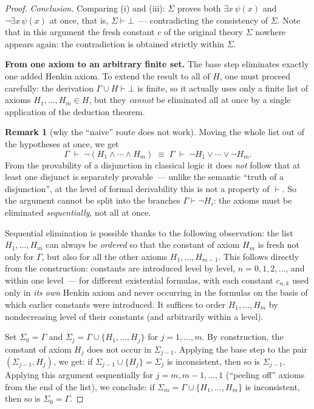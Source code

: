 \documentclass[12pt, a4paper]{article}
\theoremstyle{plain}
\theoremstyle{definition}
\newtheorem{remark}[theorem]{Remark}
\newcommand{\proves}{\vdash}
\begin{document}
\begin{proof}
\textit{Conclusion.} Comparing (i) and (iii): $\Sigma$ proves both
$\exists x\,\psi(x)$ and $\neg\exists x\,\psi(x)$ at once, that is, $\Sigma \proves \bot$~---
contradicting the consistency of $\Sigma$. Note that in this
argument the fresh constant $c$ of the original theory $\Sigma$ nowhere
appears again: the contradiction is obtained strictly within $\Sigma$.

\smallskip
\noindent\textbf{From one axiom to an arbitrary finite set.}
The base step eliminates exactly one added Henkin axiom. To
extend the result to all of $H$, one must proceed carefully: the derivation
$\Gamma \cup H \proves \bot$ is finite, so it actually uses only a
finite list of axioms $H_1, \ldots, H_m \in H$, but they \emph{cannot}
be eliminated all at once by a single application of the deduction theorem.

\begin{remark}[why the ``naive'' route does not work]
Moving the whole list out of the hypotheses at once, we get
\[
  \Gamma \;\proves\; \neg(H_1 \wedge \cdots \wedge H_m)
  \;\equiv\;
  \Gamma \;\proves\; \neg H_1 \vee \cdots \vee \neg H_m.
\]
From the provability of a disjunction in classical logic it does \emph{not}
follow that at least one disjunct is separately provable~--- unlike the
semantic ``truth of a disjunction'', at the level of formal
derivability this is not a property of $\proves$. So the argument cannot
be split into the branches $\Gamma \proves \neg H_i$: the axioms must
be eliminated \emph{sequentially}, not all at once.
\end{remark}

Sequential elimination is possible thanks to the following observation:
the list $H_1, \ldots, H_m$ can always be \emph{ordered} so that
the constant of axiom $H_m$ is fresh not only for $\Gamma$, but also for
all the other axioms $H_1, \ldots, H_{m-1}$. This follows directly from
the construction: constants are introduced level by level, $n = 0, 1, 2, \ldots$, and
within one level~--- for different existential formulas, with
each constant $c_{n,k}$ used only in \emph{its own} Henkin
axiom and never occurring in the formulas on the basis of which
earlier constants were introduced. It suffices to order $H_1,\ldots,H_m$ by
nondecreasing level of their constants (and arbitrarily within a level).

Set $\Sigma_0 = \Gamma$ and $\Sigma_j = \Gamma \cup \{H_1,\ldots,H_j\}$
for $j = 1,\ldots,m$. By construction, the constant of axiom $H_j$ does not occur
in $\Sigma_{j-1}$. Applying the base step to the pair $(\Sigma_{j-1}, H_j)$,
we get: if $\Sigma_{j-1} \cup \{H_j\} = \Sigma_j$ is inconsistent, then
so is $\Sigma_{j-1}$. Applying this argument sequentially
for $j = m, m-1, \ldots, 1$ (``peeling off'' axioms from the end of the list),
we conclude: if $\Sigma_m = \Gamma \cup \{H_1,\ldots,H_m\}$
is inconsistent, then so is $\Sigma_0 = \Gamma$.


\end{proof}
\end{document}
